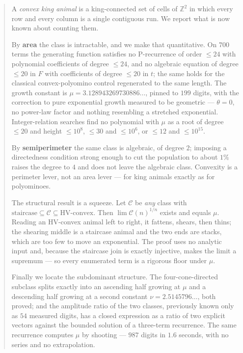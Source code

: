 \documentclass[11pt]{article}
\newcommand{\Z}{\mathbb{Z}}
\begin{document}
\begin{abstract}
\noindent
A \emph{convex king animal} is a king-connected set of cells of $\Z^2$ in which
every row and every column is a single contiguous run. We report what is now
known about counting them.

By \textbf{area} the class is intractable, and we make that quantitative. On
$700$ terms the generating function satisfies no P-recurrence of order $\le 24$
with polynomial coefficients of degree $\le 24$, and no algebraic equation of
degree $\le 20$ in $F$ with coefficients of degree $\le 20$ in $t$; the same
holds for the classical convex-polyomino control regenerated to the same length.
The growth constant is
$\mu = 3.128943269730886\dots$, pinned to $199$ digits, with the correction to
pure exponential growth measured to be geometric --- $\theta = 0$, no power-law
factor and nothing resembling a stretched exponential. Integer-relation searches
find no polynomial with $\mu$ as a root of degree $\le 20$ and height $\le 10^8$,
$\le 30$ and $\le 10^6$, or $\le 12$ and $\le 10^{15}$.

By \textbf{semiperimeter} the same class is algebraic, of degree $2$; imposing a
directedness condition strong enough to cut the population to about $1\%$ raises
the degree to $4$ and does not leave the algebraic class. Convexity is a
perimeter lever, not an area lever --- for king animals exactly as for
polyominoes.

The structural result is a squeeze. Let $\mathcal C$ be \emph{any} class with
$\text{staircase} \subseteq \mathcal C \subseteq \text{HV-convex}$. Then
$\lim \mathcal C(n)^{1/n}$ exists and equals $\mu$. Reading an HV-convex animal
left to right, it fattens, shears, then thins; the shearing middle is a
staircase animal and the two ends are stacks, which are too few to move an
exponential. The proof uses no analytic input and, because the staircase join is
exactly injective, makes the limit a supremum --- so every enumerated term is a
rigorous floor under $\mu$.

Finally we locate the subdominant structure. The four-cone-directed subclass
splits exactly into an ascending half growing at $\mu$ and a descending half
growing at a second constant $\nu = 2.5145796\dots$, both proved; and the
amplitude ratio of the two classes, previously known only as $54$ measured
digits, has a closed expression as a ratio of two explicit vectors against the
bounded solution of a three-term recurrence. The same recurrence computes $\mu$
by shooting --- $987$ digits in $1.6$ seconds, with no series and no
extrapolation.
\end{abstract}
\end{document}
